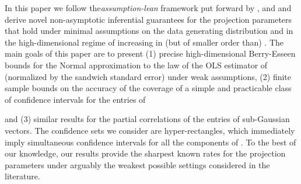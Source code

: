 \documentclass{article}
\begin{document}
In this paper we follow the{\it assumption-lean} framework put forward by \cite{Buja14}, \cite{kuchibhotla2018valid} and \cite{boot} and derive novel non-asymptotic inferential guarantees for the projection parameters that hold under minimal assumptions on the data generating distribution and in the high-dimensional regime of   increasing in (but of smaller order than)  .
The main goals of this paper are to present (1) precise high-dimensional Berry-Esseen bounds
for the Normal approximation to the law of
the OLS estimator
  of   (normalized by the sandwich standard error) under weak assumptions,
(2) finite sample bounds on the
accuracy of the coverage of a simple and practicable class of confidence intervals for the entries of
 
and
(3) similar results for the
partial correlations of the entries of sub-Gaussian vectors.
The confidence sets we consider are
hyper-rectangles, which
immediately imply
simultaneous
confidence intervals
for all the components of  .
To the best of our knowledge, our results provide the sharpest known rates for the projection parameters under arguably the weakest possible settings considered in the
literature.
\end{document}

